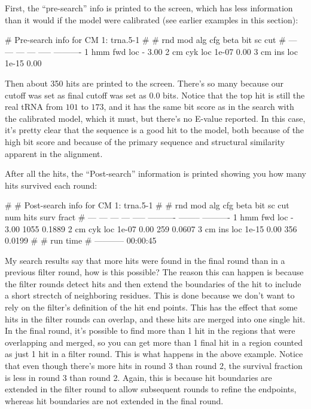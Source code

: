 First, the ``pre-search'' info is printed to the screen, which has
less information than it would if the model were calibrated (see
earlier examples in this section): 

\begin{sreoutput}
# Pre-search info for CM 1: trna.5-1
#
# rnd  mod  alg  cfg   beta  bit sc cut
# ---  ---  ---  ---  -----  ----------
    1  hmm  fwd  loc      -        3.00
    2   cm  cyk  loc  1e-07        0.00
    3   cm  ins  loc  1e-15        0.00
\end{sreoutput}

Then about 350 hits are printed to the screen. There's so many because
our cutoff was set as final cutoff was set as $0.0$ bits. Notice that 
the top hit is still the real tRNA from $101$ to $173$, and it 
has the same bit score as in the search with the calibrated model,
which it must, but there's no E-value reported. In this case, it's
pretty clear that the sequence is a good hit to the model, both
because of the high bit score and because of the primary sequence and
structural similarity apparent in the  alignment. 

After all the hits, the ``Post-search'' information is printed showing
you how many hits survived each round:

\begin{sreoutput}
#
# Post-search info for CM 1: trna.5-1
#
# rnd  mod  alg  cfg   beta  bit sc cut  num hits  surv fract
# ---  ---  ---  ---  -----  ----------  --------  ----------
    1  hmm  fwd  loc      -        3.00      1055      0.1889
    2   cm  cyk  loc  1e-07        0.00       259      0.0607
    3   cm  ins  loc  1e-15        0.00       356      0.0199
#
#    run time
# -----------
     00:00:45
\end{sreoutput}

\begin{srefaq}{My search results say that more hits were found in the
final round than in a previous filter round, how is this possible?}
The reason this can happen is because the filter
rounds detect hits and then extend the boundaries of the hit to
include a short strectch of neighboring residues. This is done because
we don't want to rely on the filter's definition of the hit end
points. This has the effect that some hits in the filter rounds can
overlap, and these hits are merged into one single hit. In the
final round, it's possible to find more than 1 hit in the regions that
were overlapping and merged, so you can get more than 1 final hit in a
region counted as just 1 hit in a filter round. This is what happens
in the above example. Notice that even though there's more hits in
round 3 than round 2, the survival fraction is less in round 3 than
round 2. Again, this is because hit boundaries are extended in the
filter round to allow subsequent rounds to refine the endpoints,
whereas hit boundaries are not extended in the final round.
\end{srefaq}

